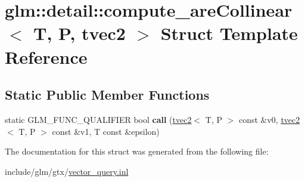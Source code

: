 \hypertarget{structglm_1_1detail_1_1compute__areCollinear_3_01T_00_01P_00_01tvec2_01_4}{}\section{glm\+:\+:detail\+:\+:compute\+\_\+are\+Collinear$<$ T, P, tvec2 $>$ Struct Template Reference}
\label{structglm_1_1detail_1_1compute__areCollinear_3_01T_00_01P_00_01tvec2_01_4}
\subsection*{Static Public Member Functions}
\begin{DoxyCompactItemize}
\item 
\mbox{\label{structglm_1_1detail_1_1compute__areCollinear_3_01T_00_01P_00_01tvec2_01_4_acec3b10a2cf7e270c961f64e8d68de5c}} 
static G\+L\+M\+\_\+\+F\+U\+N\+C\+\_\+\+Q\+U\+A\+L\+I\+F\+I\+ER bool {\bfseries call} (\hyperlink{structglm_1_1tvec2}{tvec2}$<$ T, P $>$ const \&v0, \hyperlink{structglm_1_1tvec2}{tvec2}$<$ T, P $>$ const \&v1, T const \&epsilon)
\end{DoxyCompactItemize}


The documentation for this struct was generated from the following file\+:\begin{DoxyCompactItemize}
\item 
include/glm/gtx/\hyperlink{vector__query_8inl}{vector\+\_\+query.\+inl}\end{DoxyCompactItemize}
